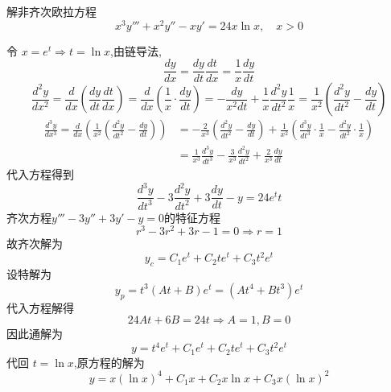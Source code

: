\begin{questions}
    \question 解非齐次欧拉方程
    \[
    x^3 y'''+x^2 y'' - x y' = 24 x \ln x, \quad x>0
    \]
    \begin{solution}
        令 $x = e^t \Rightarrow t = \ln x$,由链导法,
        \[
        \frac{dy}{dx} = \frac{dy}{dt} \frac{dt}{dx} = \frac{1}{x} \frac{dy}{dt}
        \]
        \[
        \frac{d^2y}{dx^2} 
        = \frac{d}{dx}\left(\frac{dy}{dt} \frac{dt}{dx}\right) 
        = \frac{d}{dx}\left(\frac{1}{x} \cdot \frac{dy}{dt}\right) 
        = -\frac{dy}{x^2 dt} + \frac{1}{x} \frac{d^2y}{dt^2} \frac{1}{x} 
        = \frac{1}{x^2}\left(\frac{d^2y}{dt^2} - \frac{dy}{dt}\right) 
        \]
        \begin{align*}
        \frac{d^3y}{dx^3} 
        = \frac{d}{dx}\left(\frac{1}{x^2}\left(\frac{d^2y}{dt^2} - \frac{dy}{dt}\right)\right)
        &= -\frac{2}{x^3}\left(\frac{d^2y}{dt^2} - \frac{dy}{dt}\right) + \frac{1}{x^2}\left(\frac{d^3y}{dt^3}\cdot \frac{1}{x} - \frac{d^2y}{dt^2}\cdot \frac{1}{x}\right)\\
        &= \frac{1}{x^3} \frac{d^3y}{dt^3} - \frac{3}{x^3} \frac{d^2y}{dt^2} + \frac{2}{x^3} \frac{dy}{dt}
        \end{align*}
        代入方程得到
        \[
        \frac{d^3y}{dt^3} - 3 \frac{d^2y}{dt^2} + 3 \frac{dy}{dt} - y = 24 e^t t
        \]
        齐次方程$y''' - 3y'' + 3y' - y = 0$的特征方程 
        \[
        r^3 - 3r^2 + 3r - 1 = 0 \Rightarrow r=1
        \]
        故齐次解为
        \[
        y_c=C_1 e^t + C_2 t e^t + C_3 t^2 e^t
        \]
        设特解为
        \[
        y_p = t^3 (A t + B) e^t = (A t^4 + B t^3) e^t
        \]
        代入方程解得
        \[
        24 A t + 6B = 24 t \Rightarrow A=1, B=0 
        \]
        因此通解为
        \[
        y = t^4 e^t + C_1 e^t + C_2 t e^t + C_3 t^2 e^t
        \]
        代回 $t = \ln x$,原方程的解为
        \[
        y = x (\ln x)^4 + C_1 x + C_2 x \ln x + C_3 x (\ln x)^2
        \]
    \end{solution}


\end{questions}
